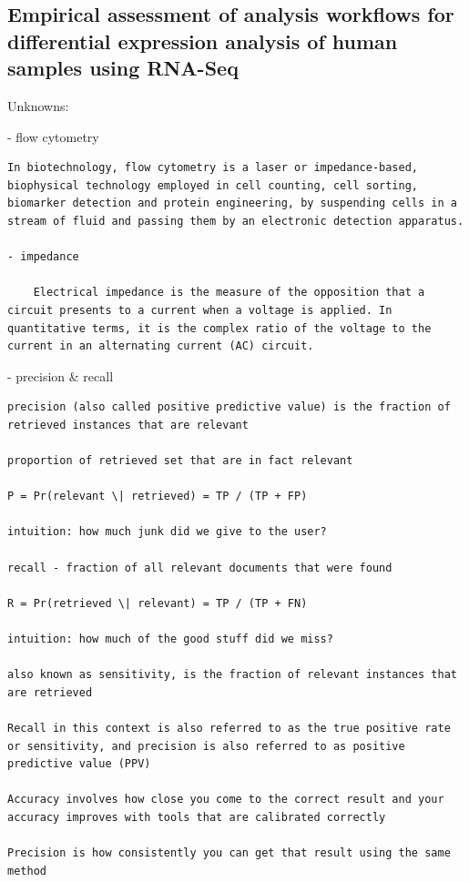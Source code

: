 \documentclass[
]{book}
\begin{document}
\hypertarget{empirical-assessment-of-analysis-workflows-for-differential-expression-analysis-of-human-samples-using-rna-seq}{%
\subsection{Empirical assessment of analysis workflows for differential expression analysis of human samples using RNA-Seq}\label{empirical-assessment-of-analysis-workflows-for-differential-expression-analysis-of-human-samples-using-rna-seq}}

Unknowns:

- flow cytometry

\begin{verbatim}
In biotechnology, flow cytometry is a laser or impedance-based, biophysical technology employed in cell counting, cell sorting, biomarker detection and protein engineering, by suspending cells in a stream of fluid and passing them by an electronic detection apparatus.

- impedance

    Electrical impedance is the measure of the opposition that a circuit presents to a current when a voltage is applied. In quantitative terms, it is the complex ratio of the voltage to the current in an alternating current (AC) circuit.
\end{verbatim}

- precision \& recall

\begin{verbatim}
precision (also called positive predictive value) is the fraction of retrieved instances that are relevant

proportion of retrieved set that are in fact relevant

P = Pr(relevant \| retrieved) = TP / (TP + FP)

intuition: how much junk did we give to the user?

recall - fraction of all relevant documents that were found

R = Pr(retrieved \| relevant) = TP / (TP + FN)

intuition: how much of the good stuff did we miss?

also known as sensitivity, is the fraction of relevant instances that are retrieved

Recall in this context is also referred to as the true positive rate or sensitivity, and precision is also referred to as positive predictive value (PPV)

Accuracy involves how close you come to the correct result and your accuracy improves with tools that are calibrated correctly

Precision is how consistently you can get that result using the same method
\end{verbatim}
\end{document}
